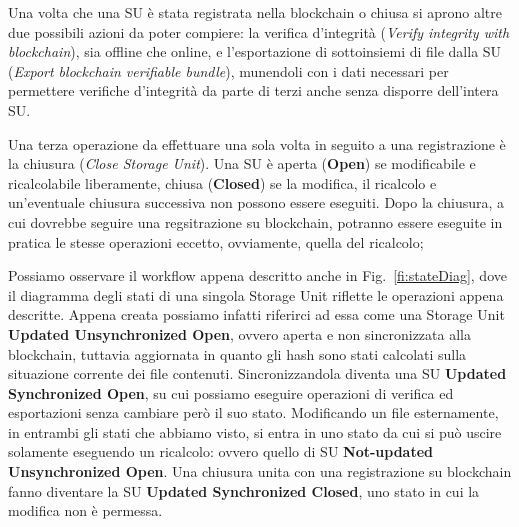 Una volta che una SU è stata registrata nella blockchain o chiusa si aprono altre
due possibili azioni da poter compiere: la verifica d’integrità (\emph{Verify integrity with blockchain}),
sia offline che online, e l’esportazione di sottoinsiemi di file dalla SU (\emph{Export blockchain verifiable bundle}),
munendoli con i dati necessari per permettere verifiche d’integrità da parte di terzi
anche senza disporre dell’intera SU.

Una terza operazione da effettuare una sola volta in seguito a una registrazione è la chiusura
(\emph{Close Storage Unit}).
Una SU è aperta (\textbf{Open}) se modificabile e ricalcolabile liberamente,
chiusa (\textbf{Closed}) se la modifica, il ricalcolo e un’eventuale chiusura
successiva non possono essere eseguiti. Dopo la chiusura, a cui dovrebbe
seguire una regsitrazione su blockchain, potranno essere eseguite
in pratica le stesse operazioni eccetto, ovviamente, quella del ricalcolo;

Possiamo osservare il workflow appena descritto anche in Fig.~\ref{fi:stateDiag}, dove il diagramma degli
stati di una singola Storage Unit riflette le operazioni appena descritte.
Appena creata possiamo infatti riferirci ad essa come una Storage Unit \textbf{Updated Unsynchronized Open},
ovvero aperta e non sincronizzata alla blockchain, tuttavia aggiornata in quanto gli hash sono stati calcolati
sulla situazione corrente dei file contenuti. Sincronizzandola diventa una SU \textbf{Updated Synchronized Open},
su cui possiamo eseguire operazioni di verifica ed esportazioni senza cambiare però il suo stato.
Modificando un file esternamente, in entrambi gli stati che abbiamo visto, si entra in uno stato da cui si
può uscire solamente eseguendo un ricalcolo: ovvero quello di SU \textbf{Not-updated Unsynchronized Open}.
Una chiusura unita con una registrazione su blockchain fanno diventare la SU
\textbf{Updated Synchronized Closed}, uno stato in cui la modifica non è permessa.


